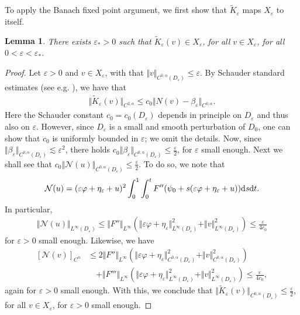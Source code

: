 \documentclass[11pt,reqno]{amsproc}
\newcommand{\N}{\mathcal{N}}
\newcommand{\ve}{\varepsilon}
\newcommand{\rmd}{{\rm d}}
\numberwithin{equation}{section}
\numberwithin{theorem}{section}
\numberwithin{prop}{section}
\numberwithin{cor}{section}
\newtheorem{lemma}{Lemma}
\numberwithin{lemma}{section}
\theoremstyle{remark}
\theoremstyle{definition}
\begin{document}
To apply the Banach fixed point argument, we first show that $\widetilde{K}_\ve$ maps $X_\ve$ to itself.

\begin{lemma}\label{lemma:invariantX}
There exists $\ve_*>0$ such that $\widetilde{K}_\ve(v)\in X_\ve$, for all $v\in X_\ve$, for all $0 < \ve < \ve_*$.
\end{lemma}

\begin{proof}
Let $\ve>0$ and $v\in X_\ve$, with that $\Vert v \Vert_{C^{0,\alpha}(D_\ve)}\leq \ve$. By Schauder standard estimates
(see e.g. \cite[Theorem 6.6]{gilbargtrudinger}), we have that
\begin{align*}
\Vert \widetilde{K}_\ve(v) \Vert_{C^{2,\alpha}} \leq c_0 \Vert  N(v) -\beta_\ve \Vert_{C^{0,\alpha}}.
\end{align*}
Here the Schauder constant $c_0=c_0(D_\ve)$ depends in principle on $D_\ve$ and thus also on $\ve$. However, since $D_\ve$ is a small and smooth perturbation of $D_0$, one can show that $c_0$ is uniformly bounded in $\ve$; we omit the details. Now, since $\Vert \beta_\ve \Vert_{C^{0,\alpha}(D_\ve)}\lesssim \ve^2$, there holds $c_0\Vert \beta_\ve \Vert_{C^{0,\alpha}(D_\ve)} \leq \frac{\ve}{2}$, for $\ve$ small enough. Next we shall see that $c_0\Vert \N(u)\Vert_{C^{0,\alpha}(D_\ve)}\leq \frac{\ve}{2}$. To do so, we note that 
\begin{equation}\label{eq:usefulN}
\N(u) = (\ve\varphi + \eta_\ve + u)^2\int_0^1 \int_0^t F''(\psi_0 + s(\ve\varphi + \eta_\ve + u)) \rmd s \rmd t.
\end{equation}
In particular,
\begin{align*}
\Vert \N(u)\Vert_{L^\infty(D_\ve)}\leq \Vert F'' \Vert_{L^\infty}\left( \Vert \ve\varphi + \eta_\ve \Vert_{L^\infty(D_\ve)}^2 + \Vert v \Vert_{L^\infty(D_\ve)}^2 \right) \leq \frac{\ve}{4c_0}
\end{align*}
for $\ve>0$ small enough. Likewise, we have
\begin{align*}
\left[ \N(v) \right]_{C^\alpha} &\leq 2\Vert F'' \Vert_{L^\infty}\left( \Vert \ve\varphi + \eta_\ve \Vert_{C^{0,\alpha}(D_\ve)}^2 + \Vert v \Vert_{C^{0,\alpha}(D_\ve)}^2 \right) \\
&\quad+ \Vert F ''' \Vert_{L^\infty}\left( \Vert \ve\varphi + \eta_\ve \Vert_{L^\infty(D_\ve)}^2 + \Vert v \Vert_{L^\infty(D_\ve)}^2 \right)\leq \frac{\ve}{4c_0},
\end{align*}
again for $\ve>0$ small enough. With this, we conclude that $\Vert \widetilde{K}_\ve(v) \Vert_{C^{0,\alpha}(D_\ve)}\leq \frac{\ve}{2}$, for all $v\in X_\ve$, for $\ve>0$ small enough.
\end{proof}
\end{document}
